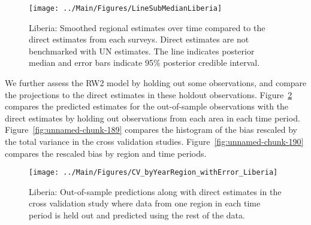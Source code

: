 \documentclass[12pt]{article}\usepackage[]{graphicx}\usepackage[]{color}
\newenvironment{knitrout}{}{} %
\begin{document}
\begin{knitrout}
\color{fgcolor}\begin{figure}[bht]

{\centering \texttt{[image: ../Main/Figures/LineSubMedianLiberia]} 

}

\caption[Liberia]{Liberia: Smoothed regional estimates over time compared to the direct estimates from each surveys. Direct estimates are not benchmarked with UN estimates. The line indicates posterior median and error bars indicate 95\% posterior credible interval.}\label{fig:unnamed-chunk-187}
\end{figure}


\end{knitrout}
We further assess the RW2 model by holding out some observations, and compare the projections to the direct estimates in these holdout observations. Figure~\ref{fig:unnamed-chunk-188} compares the predicted estimates for the out-of-sample observations  with the direct estimates by holding out observations from each area in each time period.  Figure~\ref{fig:unnamed-chunk-189} compares the histogram of the bias rescaled by the total variance in the cross validation studies. Figure~\ref{fig:unnamed-chunk-190} compares the rescaled bias by region and time periods.



 
\begin{knitrout}
\color{fgcolor}\begin{figure}[bht]

{\centering \texttt{[image: ../Main/Figures/CV\_byYearRegion\_withError\_Liberia]} 

}

\caption[Liberia]{Liberia: Out-of-sample predictions along with direct estimates in the cross validation study where data from one region in each time period is held out and predicted using the rest of the data.}\label{fig:unnamed-chunk-188}
\end{figure}


\end{knitrout}
\end{document}
